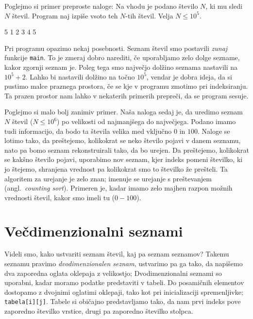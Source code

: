 \documentclass{book}
\begin{document}
\begin{examples}
  Poglejmo si primer preproste naloge:
  Na vhodu je podano število $N$, ki mu sledi $N$ števil.
  Program naj izpiše vsoto teh $N$-tih števil.
  Velja $N \le 10^5$.
  \begin{inout}
	5
	1 2 3 4 5
  \end{inout}

  Pri programu opazimo nekaj posebnosti.
  Seznam števil smo postavili \emph{zunaj} funkcije \verb+main+.
  To je zmeraj dobro narediti, če uporabljamo zelo dolge sezname, kakor zgornji
  seznam je.
  Poleg tega smo največjo dolžino seznama nastavili na $10^5+2$.
  Lahko bi nastavili dolžino na točno $10^5$, vendar je dobra ideja, da si
  pustimo malce praznega prostora, če se kje v programu zmotimo pri indeksiranju.
  Ta prazen prostor nam lahko v nekaterih primerih prepreči, da se program sesuje.
\end{examples}

\begin{examples}
  Poglejmo si malo bolj zanimiv primer.
  Naša naloga sedaj je, da uredimo seznam $N$ števil ($N \le 10^6$) po velikosti
  od najmanjšega do največjega.
  Podano imamo tudi informacijo, da bodo ta števila velika med vključno $0$ in
  $100$.
  Naloge se lotimo tako, da preštejemo, kolikokrat se neko število pojavi v
  danem seznamu, nato pa bomo seznam rekonstruirali tako, da bo urejen.
  Da preštejemo, kolikokrat se kakšno število pojavi, uporabimo nov seznam, kjer
  indeks pomeni številko, ki jo štejemo, shranjena vrednost pa kolikokrat smo to
  številko že prešteli.
  Ta algoritem za urejanje je zelo znan; imenuje se urejanje s preštevanjem
  (angl.~\textit{counting sort}).
  Primeren je, kadar imamo zelo majhen razpon možnih vrednosti števil, kakor smo
  imeli tu ($0 - 100$).
\end{examples}

\section{Večdimenzionalni seznami}

Videli smo, kako ustvariti seznam števil, kaj pa seznam seznamov?
Takemu seznamu pravimo \textit{dvodimenzionalen seznam}, ustvarimo pa ga tako,
da napišemo dva zaporedna oglata oklepaja z velikostjo;
Dvodimenzionalni seznami so uporabni, kadar moramo podatke predstaviti v tabeli.
Do posamičnih elementov dostopamo z dvojnimi oglatimi oklepaji, tako kot pri
inicializaciji spremenljivke; \verb+tabela[i][j]+.
Tabele si običajno predstavljamo tako, da nam prvi indeks pove zaporedno
številko vrstice, drugi pa zaporedno številko stolpca.
\end{document}
